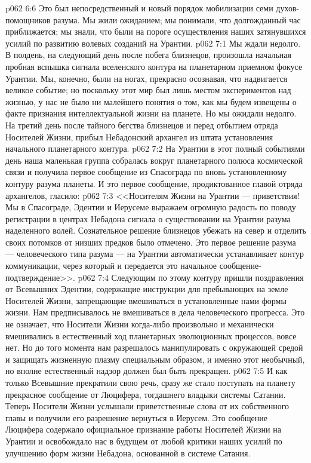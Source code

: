 \vs p062 6:6 Это был непосредственный и новый порядок мобилизации семи духов\hyp{}помощников разума. Мы жили ожиданием; мы понимали, что долгожданный час приближается; мы знали, что были на пороге осуществления наших затянувшихся усилий по развитию волевых созданий на Урантии.
\vs p062 7:1 Мы ждали недолго. В полдень, на следующий день после побега близнецов, произошла начальная пробная вспышка сигнала вселенского контура на планетарном приемном фокусе Урантии. Мы, конечно, были на ногах, прекрасно осознавая, что надвигается великое событие; но поскольку этот мир был лишь местом экспериментов над жизнью, у нас не было ни малейшего понятия о том, как мы будем извещены о факте признания интеллектуальной жизни на планете. Но мы ожидали недолго. На третий день после тайного бегства близнецов и перед отбытием отряда Носителей Жизни, прибыл Небадонский архангел из штата установления начального планетарного контура.
\vs p062 7:2 На Урантии в этот полный событиями день наша маленькая группа собралась вокруг планетарного полюса космической связи и получила первое сообщение из Спасограда по вновь установленному контуру разума планеты. И это первое сообщение, продиктованное главой отряда архангелов, гласило:
\vs p062 7:3 <<Носителям Жизни на Урантии --- приветствия! Мы в Спасограде, Эдентии и Иерусеме выражаем огромную радость по поводу регистрации в центрах Небадона сигнала о существовании на Урантии разума наделенного волей. Сознательное решение близнецов убежать на север и отделить своих потомков от низших предков было отмечено. Это первое решение разума --- человеческого типа разума --- на Урантии автоматически устанавливает контур коммуникации, через который и передается это начальное сообщение\hyp{}подтверждение>>.
\vs p062 7:4 Следующим по этому контуру пришли поздравления от Всевышних Эдентии, содержащие инструкции для пребывающих на земле Носителей Жизни, запрещающие вмешиваться в установленные нами формы жизни. Нам предписывалось не вмешиваться в дела человеческого прогресса. Это не означает, что Носители Жизни когда\hyp{}либо произвольно и механически вмешивались в естественный ход планетарных эволюционных процессов, вовсе нет. Но до того момента нам разрешалось манипулировать с окружающей средой и защищать жизненную плазму специальным образом, и именно этот необычный, но вполне естественный надзор должен был быть прекращен.
\vs p062 7:5 И как только Всевышние прекратили свою речь, сразу же стало поступать на планету прекрасное сообщение от Люцифера, тогдашнего владыки системы Сатании. Теперь Носители Жизни услышали приветственные слова от их собственного главы и получили его разрешение вернуться в Иерусем. Это сообщение Люцифера содержало официальное признание работы Носителей Жизни на Урантии и освобождало нас в будущем от любой критики наших усилий по улучшению форм жизни Небадона, основанной в системе Сатания.
